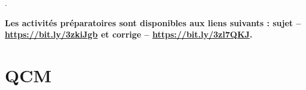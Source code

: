\documentclass[t,10pt]{article}
\begin{document}
\enteteinfo

\setlength{\columnseprule}{0.4pt}.

\textbf{Les activités préparatoires sont disponibles aux liens suivants : sujet -- \url{https://bit.ly/3zkiJgb} et corrige -- \url{https://bit.ly/3zl7QKJ}.}

\section*{QCM}

\begin{multicols}{2}

\end{multicols}
\end{document}
